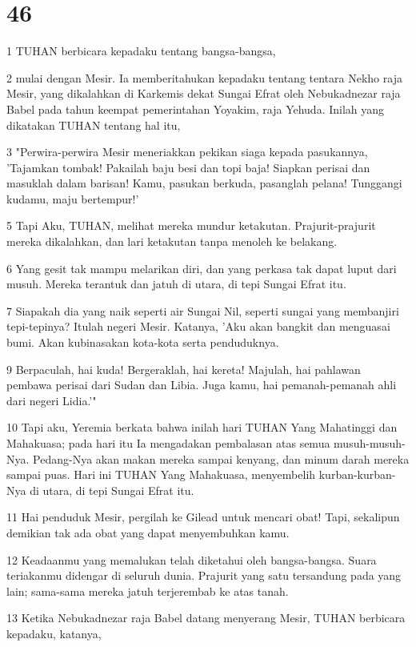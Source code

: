 \chapter{46}

\par 1 TUHAN berbicara kepadaku tentang bangsa-bangsa,
\par 2 mulai dengan Mesir. Ia memberitahukan kepadaku tentang tentara Nekho raja Mesir, yang dikalahkan di Karkemis dekat Sungai Efrat oleh Nebukadnezar raja Babel pada tahun keempat pemerintahan Yoyakim, raja Yehuda. Inilah yang dikatakan TUHAN tentang hal itu,
\par 3 "Perwira-perwira Mesir meneriakkan pekikan siaga kepada pasukannya, 'Tajamkan tombak! Pakailah baju besi dan topi baja! Siapkan perisai dan masuklah dalam barisan! Kamu, pasukan berkuda, pasanglah pelana! Tunggangi kudamu, maju bertempur!'
\par 5 Tapi Aku, TUHAN, melihat mereka mundur ketakutan. Prajurit-prajurit mereka dikalahkan, dan lari ketakutan tanpa menoleh ke belakang.
\par 6 Yang gesit tak mampu melarikan diri, dan yang perkasa tak dapat luput dari musuh. Mereka terantuk dan jatuh di utara, di tepi Sungai Efrat itu.
\par 7 Siapakah dia yang naik seperti air Sungai Nil, seperti sungai yang membanjiri tepi-tepinya? Itulah negeri Mesir. Katanya, 'Aku akan bangkit dan menguasai bumi. Akan kubinasakan kota-kota serta penduduknya.
\par 9 Berpaculah, hai kuda! Bergeraklah, hai kereta! Majulah, hai pahlawan pembawa perisai dari Sudan dan Libia. Juga kamu, hai pemanah-pemanah ahli dari negeri Lidia.'"
\par 10 Tapi aku, Yeremia berkata bahwa inilah hari TUHAN Yang Mahatinggi dan Mahakuasa; pada hari itu Ia mengadakan pembalasan atas semua musuh-musuh-Nya. Pedang-Nya akan makan mereka sampai kenyang, dan minum darah mereka sampai puas. Hari ini TUHAN Yang Mahakuasa, menyembelih kurban-kurban-Nya di utara, di tepi Sungai Efrat itu.
\par 11 Hai penduduk Mesir, pergilah ke Gilead untuk mencari obat! Tapi, sekalipun demikian tak ada obat yang dapat menyembuhkan kamu.
\par 12 Keadaanmu yang memalukan telah diketahui oleh bangsa-bangsa. Suara teriakanmu didengar di seluruh dunia. Prajurit yang satu tersandung pada yang lain; sama-sama mereka jatuh terjerembab ke atas tanah.
\par 13 Ketika Nebukadnezar raja Babel datang menyerang Mesir, TUHAN berbicara kepadaku, katanya,
